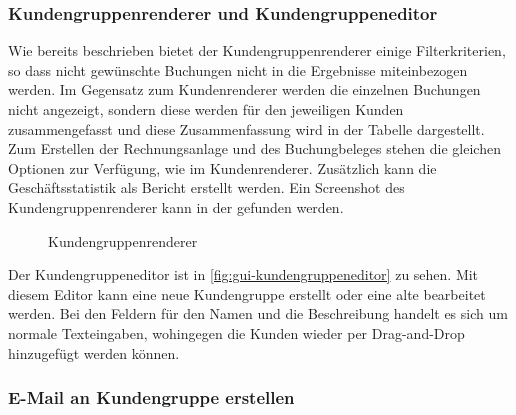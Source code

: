 \subsubsection{Kundengruppenrenderer und Kundengruppeneditor}
Wie bereits beschrieben bietet der Kundengruppenrenderer einige Filterkriterien, so dass nicht gewünschte Buchungen nicht in die Ergebnisse miteinbezogen werden.
Im Gegensatz zum Kundenrenderer werden die einzelnen Buchungen nicht angezeigt, sondern diese werden für den jeweiligen Kunden zusammengefasst und diese Zusammenfassung wird in der Tabelle dargestellt.
Zum Erstellen der Rechnungsanlage und des Buchungbeleges stehen die gleichen Optionen zur Verfügung, wie im Kundenrenderer.
Zusätzlich kann die Geschäftsstatistik als Bericht erstellt werden.
Ein Screenshot des Kundengruppenrenderer kann in der  gefunden werden.
\begin{figure}[htb]
	\centering
	\caption{Kundengruppenrenderer}
	\label{fig:gui-kundengruppenrenderer}
\end{figure}

Der Kundengruppeneditor ist in \autoref{fig:gui-kundengruppeneditor} zu sehen. Mit diesem Editor kann eine neue Kundengruppe erstellt oder eine alte bearbeitet werden. Bei den Feldern für den Namen und die Beschreibung handelt es sich um normale Texteingaben, wohingegen die Kunden wieder per Drag-and-Drop hinzugefügt werden können.


\subsubsection{E-Mail an Kundengruppe erstellen}

